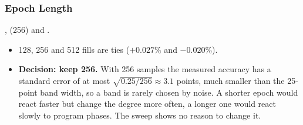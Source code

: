 \subsubsection{Epoch Length}
,  (256) and .
\tSw
{}\tAc
{}
\begin{itemize}
  \item 128, 256 and 512 fills are ties ($+0.027\%$ and $-0.020\%$).
  \item \textbf{Decision: keep 256.} With 256 samples the measured accuracy has a standard error of at most
        $\sqrt{0.25/256} \approx 3.1$ points, much smaller than the 25-point band width, so a band is rarely chosen
        by noise. A shorter epoch would react faster but change the degree more often, a longer one would react
        slowly to program phases. The sweep shows no reason to change it.
\end{itemize}


